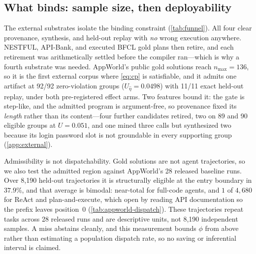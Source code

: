 \subsection{What binds: sample size, then deployability}
\label{sec:res-refusal}

\begin{table}[t]
  \centering
  \caption{Where refusal happens, and what happens where it does not. Stage
  numbers are \cref{alg:compile}'s; ``slots'' is the share of dependency slots with
  a recovered producer, ``p/a/w'' means held-out replay pass/abstain/wrong, and
  $n_{\max}$ is the largest family support against the 92 \cref{eq:cp} requires.}
  \label{tab:funnel}
  \footnotesize
  \setlength{\tabcolsep}{4pt}
  
\end{table}

The external substrates isolate the binding constraint (\cref{tab:funnel}). All
four clear provenance, synthesis, and held-out replay with \emph{no} wrong
execution anywhere. NESTFUL, API-Bank, and executed BFCL gold plans then retire,
and each retirement was arithmetically settled before the compiler ran---which is
why a fourth substrate was needed. AppWorld's public gold solutions reach
$n_{\max}=136$, so it is the first external corpus where \cref{eq:cp} is
satisfiable, and it admits one artifact at 92/92 zero-violation groups
($U_{\hat\eta}=0.0498$) with 11/11 exact held-out replay, under both
pre-registered effect arms. Two features bound it: the gate is step-like, and the
admitted program is argument-free, so provenance fixed its \emph{length} rather
than its content---four further candidates retired, two on 89 and 90 eligible
groups at $U=0.051$, and one mined three calls but synthesized two because its
login password slot is not groundable in every supporting group
(\cref{app:external}).

Admissibility is not dispatchability. Gold solutions are not agent
trajectories, so we also test the admitted region against AppWorld's 28 released
baseline runs. Over 8{,}190 held-out trajectories it is structurally eligible at
the entry boundary in $37.9\%$, and that average is bimodal: near-total for
full-code agents, and $1$ of $4{,}680$ for ReAct and plan-and-execute, which open
by reading API documentation so the prefix leaves position~0
(\cref{tab:appworld-dispatch}). These trajectories repeat tasks across 28 released
runs and are descriptive units, not 8{,}190 independent samples. A miss abstains
cleanly, and this measurement bounds $\phi$ from above rather than estimating a
population dispatch rate, so no saving or inferential interval is claimed.
